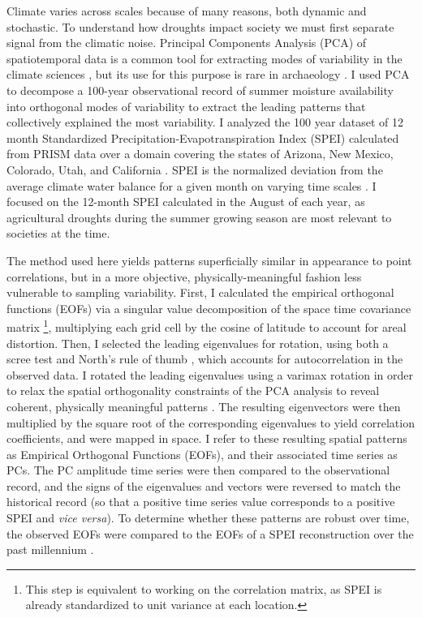 \documentclass[11pt]{iopart}
\begin{document}
Climate varies across scales because of many reasons, both dynamic and stochastic. To understand how droughts impact society we must first separate signal from the climatic noise. Principal Components Analysis (PCA) of spatiotemporal data is a common tool for extracting modes of variability in the climate sciences \parencite{Lorenz1956,Hannachi2007}, but its use for this purpose is rare in archaeology \parencite{Weiss1982, Cordell2007}. I used PCA to decompose a 100-year observational record of summer moisture availability into orthogonal modes of variability to extract the leading patterns that collectively explained the most variability. I analyzed the 100 year dataset of 12 month Standardized Precipitation-Evapotranspiration Index (SPEI) calculated from PRISM data over a domain covering the states of Arizona, New Mexico, Colorado, Utah, and California \parencite{Daly1997}. SPEI is the normalized deviation from the average climate water balance for a given month on varying time scales \parencite{Vicente-Serrano2010}. I focused on the 12-month SPEI calculated in the August of each year, as agricultural droughts during the summer growing season are most relevant to societies at the time.

The method used here yields patterns superficially similar in appearance to point correlations, but in a more objective, physically-meaningful fashion less vulnerable to sampling variability. First, I calculated the empirical orthogonal functions (EOFs) via a singular value decomposition of the space time covariance matrix \footnote{This step is equivalent to working on the correlation matrix, as SPEI is already standardized to unit variance at each location.}, multiplying each grid cell by the cosine of latitude to account for areal distortion. Then, I selected the leading eigenvalues for rotation, using both a scree test and North's rule of thumb \parencite{North1982}, which accounts for autocorrelation in the observed data. I rotated the leading eigenvalues using a varimax rotation in order to relax the spatial orthogonality constraints of the PCA analysis to reveal coherent, physically meaningful patterns \parencite{Richman1986}. The resulting eigenvectors were then multiplied by the square root of the corresponding eigenvalues to yield correlation coefficients, and were mapped in space. I refer to these resulting spatial patterns as Empirical Orthogonal Functions (EOFs), and their associated time series as PCs. The PC amplitude time series were then compared to the observational record, and the signs of the eigenvalues and vectors were reversed to match the historical record (so that a positive time series value corresponds to a positive SPEI and \textit{vice versa}). To determine whether these patterns are robust over time, the observed EOFs were compared to the EOFs of a SPEI reconstruction over the past millennium \parencite{Steiger2018}.
\end{document}
